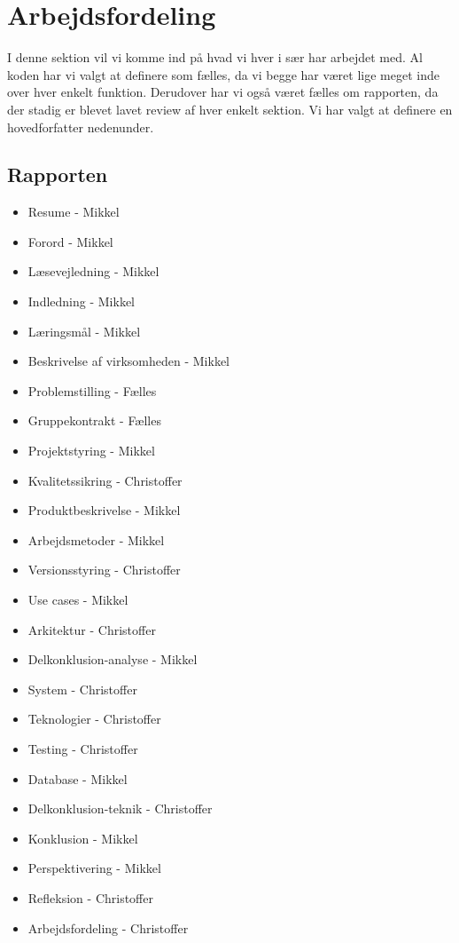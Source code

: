 \section{Arbejdsfordeling}
I denne sektion vil vi komme ind på hvad vi hver i sær har arbejdet med.
Al koden har vi valgt at definere som fælles, da vi begge har været lige meget inde over hver enkelt funktion.
Derudover har vi også været fælles om rapporten, da der stadig er blevet lavet review af hver enkelt sektion.
Vi har valgt at definere en hovedforfatter nedenunder.
\subsection{Rapporten}
\begin{itemize}
    \item{Resume - Mikkel}
    \item{Forord - Mikkel}
    \item{Læsevejledning - Mikkel}
    \item{Indledning - Mikkel}
    \item{Læringsmål - Mikkel}
    \item{Beskrivelse af virksomheden - Mikkel}
    \item{Problemstilling - Fælles}
    \item{Gruppekontrakt - Fælles}
    \item{Projektstyring - Mikkel}
    \item{Kvalitetssikring - Christoffer}
    \item{Produktbeskrivelse - Mikkel}
    \item{Arbejdsmetoder - Mikkel}
    \item{Versionsstyring - Christoffer}
    \item{Use cases - Mikkel}
    \item{Arkitektur - Christoffer}
    \item{Delkonklusion-analyse - Mikkel}
    \item{System - Christoffer}
    \item{Teknologier - Christoffer}
    \item{Testing - Christoffer}
    \item{Database - Mikkel}
    \item{Delkonklusion-teknik - Christoffer}
    \item{Konklusion - Mikkel}
    \item{Perspektivering - Mikkel}
    \item{Refleksion - Christoffer}
    \item{Arbejdsfordeling - Christoffer}
\end{itemize}
    
